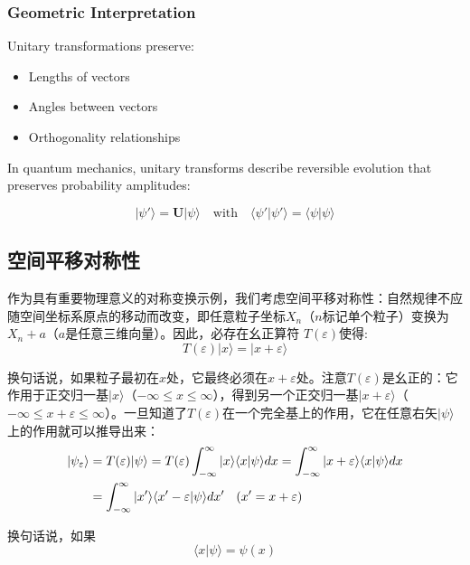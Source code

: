 \subsubsection*{Geometric Interpretation}

Unitary transformations preserve:
\begin{itemize}
	\item Lengths of vectors
	\item Angles between vectors
	\item Orthogonality relationships
\end{itemize}

In quantum mechanics, unitary transforms describe reversible evolution that preserves probability amplitudes:

\[
|\psi'\rangle = \mathbf{U}|\psi\rangle \quad \text{with} \quad \langle\psi'|\psi'\rangle = \langle\psi|\psi\rangle
\]
\subsection{空间平移对称性}
作为具有重要物理意义的对称变换示例，我们考虑空间平移对称性：自然规律不应随空间坐标系原点的移动而改变，即任意粒子坐标$X_n$（$n$标记单个粒子）变换为$X_n+a$（$a$是任意三维向量）。因此，必存在幺正算符 $T(\varepsilon )$使得:
\begin{equation}
	T(\varepsilon)|x\rangle = |x + \varepsilon\rangle \label{11.2.6}
\end{equation}

换句话说，如果粒子最初在\(x\)处，它最终必须在\(x + \varepsilon\)处。注意\(T(\varepsilon)\)是幺正的：它作用于正交归一基\(|x\rangle\)（\(-\infty \leq x \leq \infty\)），得到另一个正交归一基\(|x + \varepsilon\rangle\)（\(-\infty \leq x + \varepsilon \leq \infty\)）。一旦知道了\(T(\varepsilon)\)在一个完全基上的作用，它在任意右矢\(|\psi\rangle\)上的作用就可以推导出来：
\begin{equation}
	\begin{aligned}
		|\psi_\varepsilon\rangle &= T(\varepsilon)|\psi\rangle = T(\varepsilon) \int_{-\infty}^{\infty} |x\rangle\langle x|\psi\rangle dx = \int_{-\infty}^{\infty} |x + \varepsilon\rangle\langle x|\psi\rangle dx \\
		&=\int_{ - \infty }^\infty  | x'\rangle \langle x' - \varepsilon |\psi \rangle dx'\;\;\;{\kern 1pt} (x' = x + \varepsilon ){\rm{ }}
	\end{aligned}
\end{equation}

换句话说，如果
\begin{equation}
	\langle x|\psi\rangle = \psi(x)
\end{equation}

